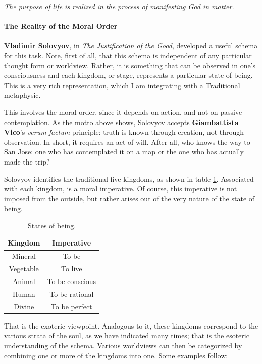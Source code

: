\textit{The purpose of life is realized in the process of manifesting God in matter.}

\paragraph{The Reality of the Moral Order}


\textbf{Vladimir Solovyov}, in \emph{The Justification of the Good}, developed a useful schema for this task. Note, first of all, that this schema is independent of any particular thought form or worldview. Rather, it is something that can be observed in one's consciousness and each kingdom, or stage, represents a particular state of being. This is a very rich representation, which I am integrating with a Traditional metaphysic.

This involves the moral order, since it depends on action, and not on passive contemplation. As the motto above shows, Solovyov accepts \textbf{Giambattista Vico}'s \emph{verum factum} principle: truth is known through creation, not through observation. In short, it requires an act of will. After all, who knows the way to San Jose: one who has contemplated it on a map or the one who has actually made the trip?

Solovyov identifies the traditional five kingdoms, as shown in table \ref{tab:FiveStatesBeing}. Associated with each kingdom, is a moral imperative. Of course, this imperative is not imposed from the outside, but rather arises out of the very nature of the state of being.

\begin{table}[h]\centering\small
\begin{tabular}{cc}\toprule
\textbf{Kingdom} & \textbf{Imperative} \\\midrule Mineral & To be \\ Vegetable & To live \\ Animal & To be conscious \\ Human & To be rational \\ Divine & To be perfect \\\bottomrule
\end{tabular}
\label{tab:FiveStatesBeing}
\caption{States of being.}
\end{table}

That is the exoteric viewpoint. Analogous to it, these kingdoms correspond to the various strata of the soul, as we have indicated many times; that is the esoteric understanding of the schema. Various worldviews can then be categorized by combining one or more of the kingdoms into one. Some examples follow:

